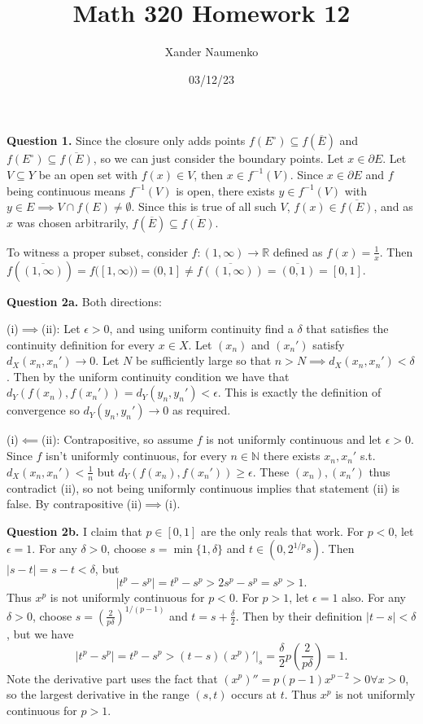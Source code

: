 \documentclass[letterpaper, reqno,11pt]{article}
\begin{document}
\title{Math 320 Homework 12}
\date{03/12/23}
\author{Xander Naumenko}
\maketitle

{\medskip\noindent\bf Question 1.} Since the closure only adds points $f(E^{\circ})\subseteq f(\overline{E})$ and $f(E^{\circ})\subseteq \overline{f(E)}$, so we can just consider the boundary points. Let $x\in \partial E$. Let $V\subseteq Y$ be an open set with $f(x)\in V$, then $x\in f^{-1}(V)$. Since $x\in \partial E$ and $f$ being continuous means $f^{-1}(V)$ is open, there exists $y\in f^{-1}(V)$ with $y\in E\implies V\cap f(E)\neq \emptyset$. Since this is true of all such $V$, $f(x)\in \overline{f(E)}$, and as $x$ was chosen arbitrarily, $f(\overline{E})\subseteq \overline{f(E)}$.

To witness a proper subset, consider $f:(1,\infty)\to \mathbb{R}$ defined as $f(x)=\frac{1}{x}$. Then $f(\overline{(1,\infty)})=f([1,\infty))=(0,1]\neq \overline{f((1,\infty))}=\overline{(0,1)}=[0,1]$.

\newpage\phantom{blabla}
\newpage

{\medskip\noindent\bf Question 2a.} Both directions:

(i)$\implies$(ii): Let $\epsilon>0$, and using uniform continuity find a $\delta$ that satisfies the continuity definition for every $x\in X$. Let $(x_n)$ and $(x_n')$ satisfy $d_X(x_n,x_n')\to 0$. Let $N$ be sufficiently large so that $n>N\implies d_X(x_n,x_n')<\delta$. Then by the uniform continuity condition we have that $d_Y(f(x_n),f(x_n'))=d_Y(y_n,y_n')<\epsilon$. This is exactly the definition of convergence so $d_Y(y_n,y_n')\to 0$ as required.

(i)$\impliedby$(ii): Contrapositive, so assume $f$ is not uniformly continuous and let $\epsilon>0$. Since $f$ isn't uniformly continuous, for every $n\in \mathbb{N}$ there exists $x_n,x_n'$ s.t. $d_X(x_n,x_n')<\frac{1}{n}$ but $d_Y(f(x_n),f(x_n'))\geq\epsilon$. These $(x_n),(x_n')$ thus contradict (ii), so not being uniformly continuous implies that statement (ii) is false. By contrapositive (ii)$\implies$(i).

{\medskip\noindent\bf Question 2b.} I claim that $p\in[0,1]$ are the only reals that work. For $p<0$, let $\epsilon=1$. For any $\delta>0$, choose $s=\min \{1,\delta\}$ and $t\in (0,2^{1 /p}s)$. Then $|s-t|=s-t<\delta$, but
\[
    \left| t^{p}-s^{p} \right| =t^{p}-s^{p}>2s^{p}-s^{p}=s^{p}>1
.\]
Thus $x^{p}$ is not uniformly continuous for $p<0$. For $p>1$, let $\epsilon=1$ also. For any $\delta>0$, choose $s=\left( \frac{2}{p\delta} \right) ^{1 /(p-1)}$ and $t=s+\frac{\delta}{2}$. Then by their definition $|t-s|<\delta$, but we have
\[
\left| t ^{p}-s^{p} \right| =t ^{p}-s^{p}> (t-s)\left( x^{p} \right)'\big|_s=\frac{\delta}{2} p \left( \frac{2}{p\delta} \right)=1
.\]
Note the derivative part uses the fact that $(x^{p})''=p(p-1)x^{p-2}>0\forall x>0$, so the largest derivative in the range $(s,t)$ occurs at $t$. Thus $x^{p}$ is not uniformly continuous for $p>1$. 
\end{document}

